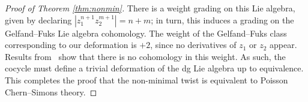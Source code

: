 \begin{proof}[Proof of Theorem \ref{thm:nonmin}]
There is a weight grading on this Lie algebra, given by declaring $|z_1^{n+1} z_2^{m+1}| = n+m$; in turn, this induces a grading on the Gelfand--Fuks Lie algebra cohomology.  
The weight of the Gelfand--Fuks class corresponding to our deformation is $+2$, since no derivatives of $z_1$ or $z_2$ appear. 
Results from~\cite{Fuks} show that there is no cohomology in this weight. 
As such, the cocycle must define a trivial deformation of the dg Lie algebra up to equivalence.
This completes the proof that the non-minimal twist is equivalent to Poisson Chern--Simons theory. 
\end{proof}

